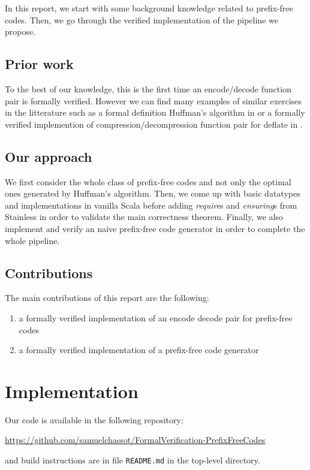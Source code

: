 \documentclass[a4paper,UKenglish,cleveref, autoref, thm-restate]{lipics-v2021}
\begin{document}
In this report, we start with some background knowledge related to prefix-free codes. Then, we go through the verified implementation of the pipeline we propose.

\subsection*{Prior work}

To the best of our knowledge, this is the first time an encode/decode function pair is formally verified.
However we can find many examples of similar exercises in the litterature such as a formal definition Huffman's algorithm in \cite{formal} or a formally verified implemention of compression/decompression function pair for deflate in \cite{deflate}.

\subsection*{Our approach} %

We first consider the whole class of prefix-free codes and not only the optimal ones generated by Huffman's algorithm.
Then, we come up with basic datatypes and implementations in vanilla Scala before adding  \emph{require}s and \emph{ensuring}s from Stainless in order to validate the main correctness theorem.
Finally, we also implement and verify an naive prefix-free code generator in order to complete the whole pipeline.

\pagebreak

\subsection*{Contributions} %

The main contributions of this report are the following:
\begin{enumerate}
    \item a formally verified implementation of an encode decode pair for prefix-free codes
    \item a formally verified implementation of a prefix-free code generator
\end{enumerate}

\section{Implementation}

Our code is available in the following repository:
\begin{center}
    \url{https://github.com/samuelchassot/FormalVerification-PrefixFreeCodes}
\end{center}
and build instructions are in file \verb|README.md| in the top-level directory.
\end{document}
